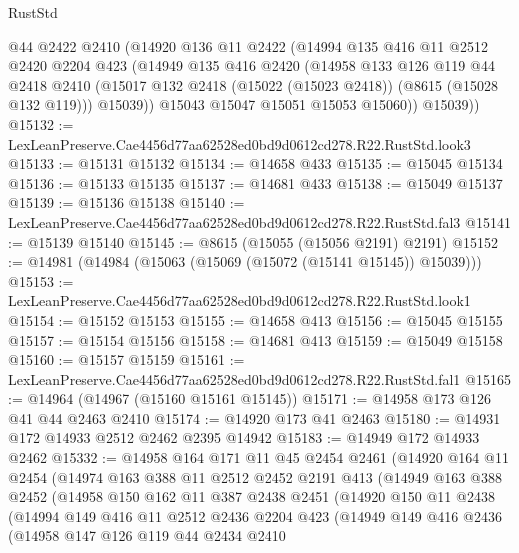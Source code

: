 \begin{lexlean}{RustStd}
\begin{coremodule}
        @44
        @2422
        @2410
        (@14920
          @136
          @11
          @2422
          (@14994
            @135
            @416
            @11
            @2512
            @2420
            @2204
            @423
            (@14949
              @135
              @416
              @2420
              (@14958
                @133
                @126
                @119
                @44
                @2418
                @2410
                (@15017 @132 @2418 (@15022 (@15023 @2418)) (@8615 (@15028 @132 @119)))
                @15039))
            @15043
            @15047
            @15051
            @15053
            @15060))
        @15039))
@15132 := LexLeanPreserve.Cae4456d77aa62528ed0bd9d0612cd278.R22.RustStd.look3
@15133 := @15131 @15132
@15134 := @14658 @433
@15135 := @15045 @15134
@15136 := @15133 @15135
@15137 := @14681 @433
@15138 := @15049 @15137
@15139 := @15136 @15138
@15140 := LexLeanPreserve.Cae4456d77aa62528ed0bd9d0612cd278.R22.RustStd.fal3
@15141 := @15139 @15140
@15145 := @8615 (@15055 (@15056 @2191) @2191)
@15152 := @14981 (@14984 (@15063 (@15069 (@15072 (@15141 @15145)) @15039)))
@15153 := LexLeanPreserve.Cae4456d77aa62528ed0bd9d0612cd278.R22.RustStd.look1
@15154 := @15152 @15153
@15155 := @14658 @413
@15156 := @15045 @15155
@15157 := @15154 @15156
@15158 := @14681 @413
@15159 := @15049 @15158
@15160 := @15157 @15159
@15161 := LexLeanPreserve.Cae4456d77aa62528ed0bd9d0612cd278.R22.RustStd.fal1
@15165 := @14964 (@14967 (@15160 @15161 @15145))
@15171 := @14958 @173 @126 @41 @44 @2463 @2410
@15174 := @14920 @173 @41 @2463
@15180 := @14931 @172 @14933 @2512 @2462 @2395 @14942
@15183 := @14949 @172 @14933 @2462
@15332 := @14958
    @164
    @171
    @11
    @45
    @2454
    @2461
    (@14920
      @164
      @11
      @2454
      (@14974
        @163
        @388
        @11
        @2512
        @2452
        @2191
        @413
        (@14949
          @163
          @388
          @2452
          (@14958
            @150
            @162
            @11
            @387
            @2438
            @2451
            (@14920
              @150
              @11
              @2438
              (@14994
                @149
                @416
                @11
                @2512
                @2436
                @2204
                @423
                (@14949
                  @149
                  @416
                  @2436
                  (@14958
                    @147
                    @126
                    @119
                    @44
                    @2434
                    @2410

\end{coremodule}
\end{lexlean}
